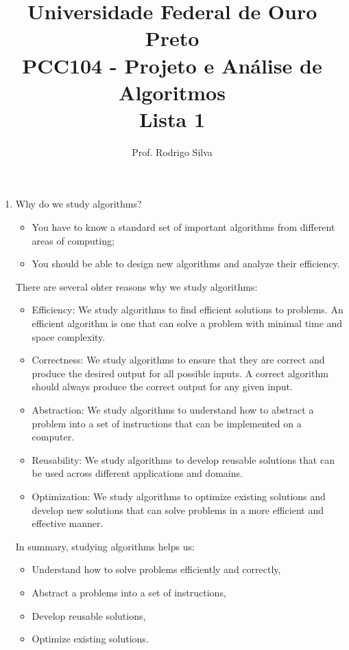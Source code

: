 \documentclass{article}
\title{\vspace{-2 cm}Universidade Federal de Ouro Preto \\ PCC104 - Projeto e Análise de Algoritmos \\ Lista 1}
\author{Prof. Rodrigo Silva}
\begin{document}
\maketitle

\begin{enumerate}
    \item Why do we study algorithms?
    
    \begin{itemize}
        \item You have to know a standard set of important algorithms from different areas of computing; 
        \item You should be able to design new algorithms and analyze their efficiency.
    \end{itemize}

    There are several ohter reasons why we study algorithms:
    
    \begin{itemize}

        \item Efficiency: We study algorithms to find efficient solutions to problems. An efficient algorithm is one that can solve a problem with minimal time and space complexity.
    
        \item Correctness: We study algorithms to ensure that they are correct and produce the desired output for all possible inputs. A correct algorithm should always produce the correct output for any given input.
    
        \item Abstraction: We study algorithms to understand how to abstract a problem into a set of instructions that can be implemented on a computer.
    
        \item Reusability: We study algorithms to develop reusable solutions that can be used across different applications and domains.
    
        \item Optimization: We study algorithms to optimize existing solutions and develop new solutions that can solve problems in a more efficient and effective manner.
    
    \end{itemize}
        

    In summary, studying algorithms helps us: 
    \begin{itemize}
        \item Understand how to solve problems efficiently and correctly, 
        \item Abstract a problems into a set of instructions, 
        \item Develop reusable solutions, 
        \item Optimize existing solutions.
    \end{itemize}


\end{enumerate}
\end{document}
